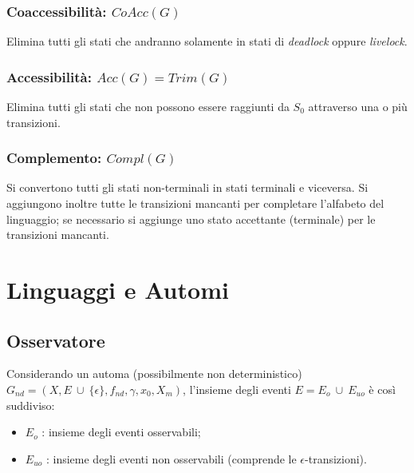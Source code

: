 \documentclass[a4paper, notitlepage, 10pt]{report}
\begin{document}
\subsection*{Coaccessibilità: $CoAcc (G)$}
Elimina tutti gli stati che andranno solamente in stati di \textit{deadlock} oppure \textit{livelock}.

\subsection*{Accessibilità: $Acc (G) = Trim(G)$}
Elimina tutti gli stati che non possono essere raggiunti da $S_0$ attraverso una o più transizioni.

\subsection*{Complemento: $Compl (G)$}
Si convertono tutti gli stati non-terminali in stati terminali e viceversa. Si aggiungono inoltre tutte le transizioni mancanti per completare l'alfabeto del linguaggio; se necessario si aggiunge uno stato accettante (terminale) per le transizioni mancanti.



\chapter*{Linguaggi e Automi}

\section*{Osservatore}
Considerando un automa (possibilmente non deterministico) $G_{nd} = (X, E ~\cup~ \{\epsilon \}, f_{nd}, \gamma, x_0, X_m)$, l'insieme degli eventi $E = E_o ~\cup~ E_{uo}$ è così suddiviso:
\begin{itemize}
	\item $E_{o}$ : insieme degli eventi osservabili;
	\item $E_{uo}$ : insieme degli eventi non osservabili (comprende le $\epsilon$-transizioni).
\end{itemize}
\end{document}
